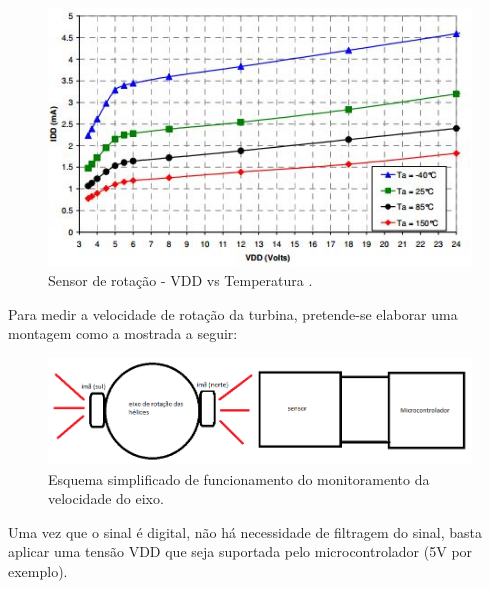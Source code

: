 	\begin{figure}[!htbp]
	  \centering
	  \includegraphics[scale=0.5]{editaveis/figuras/sensor_rotacao_vdd_vs_temperatura}
	  \caption[Sensor de rotação -  VDD vs Temperatura]
	  {Sensor de rotação -  VDD vs Temperatura \cite{melexis}.}
	  \label{sensor_rotacao_vdd_vs_temperatura}
	\end{figure}
	
	Para medir a velocidade de rotação da turbina, pretende-se elaborar uma montagem como a mostrada a seguir:
	 
	\begin{figure}[!htbp]
	  \centering
	  \includegraphics[scale=0.4]{editaveis/figuras/sensor_rotacao_monitoramento_velocidade}
	  \caption[Esquema simplificado de funcionamento do monitoramento da velocidade do eixo]
	  {Esquema simplificado de funcionamento do monitoramento da velocidade do eixo.}
	  \label{sensor_rotacao_monitoramento_velocidade}
	\end{figure}
	
	Uma vez que o sinal é digital, não há necessidade de filtragem do sinal, basta aplicar uma tensão VDD que seja suportada
	pelo microcontrolador (5V por exemplo).
	
